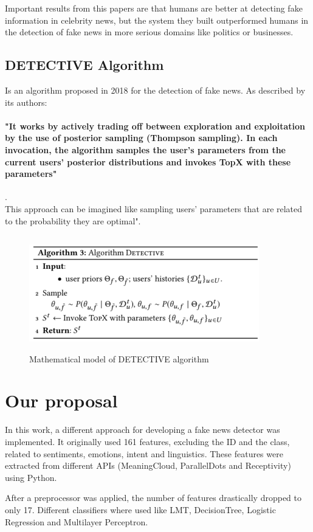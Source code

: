 \documentclass[runningheads]{llncs}
\begin{document}
Important results from this papers are that humans are better at detecting fake information in celebrity news, but the system they built outperformed humans in the detection of fake news in more serious domains like politics or businesses.
\subsection{DETECTIVE Algorithm}
Is an algorithm proposed in 2018 for the detection of fake news. As described by its authors:
\paragraph{"It works by actively trading off between exploration and exploitation by the use of posterior sampling (Thompson sampling). In each invocation, the algorithm samples the user's parameters from the current users' posterior distributions and invokes TopX with these parameters"}. \\

This approach can be imagined like sampling users' parameters that are related to the probability they are optimal". 

\begin{figure}[hbt!]
\centering
\includegraphics[width=10cm, height=5cm]{DETECTIVE.png}
\caption{Mathematical model of DETECTIVE algorithm}
\end{figure}


\section{Our proposal}
In this work, a different approach for developing a fake news detector was implemented. It originally used 161 features, excluding the ID and the class, related to sentiments, emotions, intent and linguistics. These features were extracted from different APIs (MeaningCloud, ParallelDots and Receptivity) using Python.

After a preprocessor was applied, the number of features drastically dropped to only 17. Different classifiers where used like LMT, DecisionTree, Logistic Regression and Multilayer Perceptron.
\end{document}
